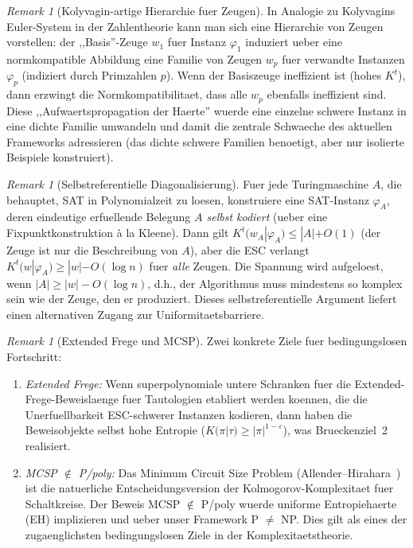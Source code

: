 \documentclass[aps,prd,twocolumn,superscriptaddress,nofootinbib]{revtex4-2}
\theoremstyle{definition}
\theoremstyle{remark}
\newtheorem{remark}[theorem]{Remark}
\begin{document}
\begin{remark}[Kolyvagin-artige Hierarchie fuer Zeugen]
\label{rem:kolyvagin-hierarchy}
In Analogie zu Kolyvagins Euler-System in der Zahlentheorie kann man sich eine Hierarchie von Zeugen vorstellen: der ,,Basis''-Zeuge $w_1$ fuer Instanz $\varphi_1$ induziert ueber eine normkompatible Abbildung eine Familie von Zeugen $w_p$ fuer verwandte Instanzen $\varphi_p$ (indiziert durch Primzahlen $p$). Wenn der Basiszeuge ineffizient ist (hohes $K^t$), dann erzwingt die Normkompatibilitaet, dass alle $w_p$ ebenfalls ineffizient sind. Diese ,,Aufwaertspropagation der Haerte'' wuerde eine einzelne schwere Instanz in eine dichte Familie umwandeln und damit die zentrale Schwaeche des aktuellen Frameworks adressieren (das dichte schwere Familien benoetigt, aber nur isolierte Beispiele konstruiert).
\end{remark}

\begin{remark}[Selbstreferentielle Diagonalisierung]
\label{rem:self-referential}
Fuer jede Turingmaschine $A$, die behauptet, SAT in Polynomialzeit zu loesen, konstruiere eine SAT-Instanz $\varphi_A$, deren eindeutige erfuellende Belegung \emph{$A$ selbst kodiert} (ueber eine Fixpunktkonstruktion \`a la Kleene). Dann gilt $K^t(w_A | \varphi_A) \leq |A| + O(1)$ (der Zeuge ist nur die Beschreibung von $A$), aber die ESC verlangt $K^t(w | \varphi_A) \geq |w| - O(\log n)$ fuer \emph{alle} Zeugen. Die Spannung wird aufgeloest, wenn $|A| \geq |w| - O(\log n)$, d.h., der Algorithmus muss mindestens so komplex sein wie der Zeuge, den er produziert. Dieses selbstreferentielle Argument liefert einen alternativen Zugang zur Uniformitaetsbarriere.
\end{remark}

\begin{remark}[Extended Frege und MCSP]
\label{rem:frege-mcsp}
Zwei konkrete Ziele fuer bedingungslosen Fortschritt:
\begin{enumerate}
\item \emph{Extended Frege:} Wenn superpolynomiale untere Schranken fuer die Extended-Frege-Beweislaenge fuer Tautologien etabliert werden koennen, die die Unerfuellbarkeit ESC-schwerer Instanzen kodieren, dann haben die Beweisobjekte selbst hohe Entropie ($K(\pi | \tau) \geq |\pi|^{1-\varepsilon}$), was Brueckenziel~2 realisiert.
\item \emph{MCSP $\notin$ P/poly:} Das Minimum Circuit Size Problem (Allender--Hirahara~\cite{AllenderHirahara2019}) ist die natuerliche Entscheidungsversion der Kolmogorov-Komplexitaet fuer Schaltkreise. Der Beweis MCSP $\notin$ P/poly wuerde uniforme Entropiehaerte (EH) implizieren und ueber unser Framework P $\neq$ NP. Dies gilt als eines der zugaenglichsten bedingungslosen Ziele in der Komplexitaetstheorie.
\end{enumerate}
\end{remark}
\end{document}
